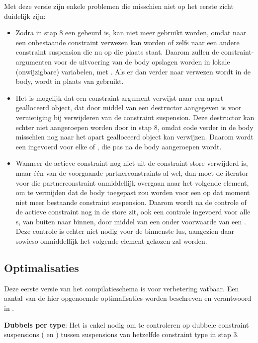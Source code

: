 {Met deze versie zijn enkele problemen die misschien niet op het eerste zicht duidelijk zijn: \begin{itemize}
  \item Zodra in stap 8 een  gebeurd is, kan  niet meer gebruikt worden, omdat naar een onbestaande constraint verwezen kan worden of zelfs naar een andere constraint suspension die nu op die plaats staat. Daarom zullen de constraint-argumenten voor de uitvoering van de body opslagen worden in lokale (onwijzigbare) variabelen, met . Als er dan verder naar verwezen wordt in de body, wordt  in plaats van  gebruikt.
  \item Het is mogelijk dat een constraint-argument verwijst naar een apart gealloceerd object, dat door middel van een destructor aangegeven is voor vernietiging bij verwijderen van de constraint suspension. Deze destructor kan echter niet aangeroepen worden door  in stap 8, omdat code verder in de body misschien nog naar het apart gealloceerd object kan verwijzen. Daarom wordt een  ingevoerd voor elke  of , die pas na de body aangeroepen wordt.
  \item Wanneer de actieve constraint nog niet uit de constraint store verwijderd is, maar \'e\'en van de voorgaande partnerconstraints al wel, dan moet de iterator voor die partnerconstraint onmiddellijk overgaan naar het volgende element, om te vermijden dat de body toegepast zou worden voor een op dat moment niet meer bestaande constraint suspension. Daarom wordt na de controle of de actieve constraint nog in de store zit, ook een controle ingevoerd voor alle s, van buiten naar binnen, door middel van een  onder voorwaarde van een . Deze controle is echter niet nodig voor de binnenste lus, aangezien daar sowieso onmiddellijk het volgende element gekozen zal worden.
\end{itemize}

\subsection{Optimalisaties} \label{sec:optim}

Deze eerste versie van het compilatieschema is voor verbetering vatbaar. Een aantal van de hier opgenoemde optimalisaties worden beschreven en verantwoord in \cite{tomsphdthesis}. 

{\bf Dubbels per type}: Het is enkel nodig om te controleren op dubbele constraint suspensions ( en ) tussen suspensions van hetzelfde constraint type in stap 3.

}
